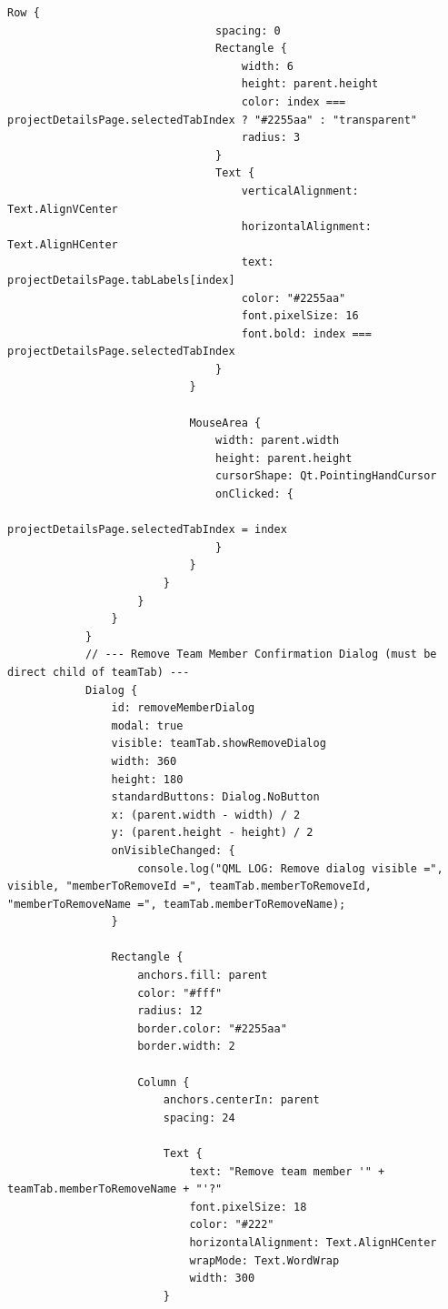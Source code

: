 \documentclass{report}
\begin{document}
\begin{lstlisting}[style=qmlstyle]
                            Row {
                                spacing: 0
                                Rectangle {
                                    width: 6
                                    height: parent.height
                                    color: index === projectDetailsPage.selectedTabIndex ? "#2255aa" : "transparent"
                                    radius: 3
                                }
                                Text {
                                    verticalAlignment: Text.AlignVCenter
                                    horizontalAlignment: Text.AlignHCenter
                                    text: projectDetailsPage.tabLabels[index]
                                    color: "#2255aa"
                                    font.pixelSize: 16
                                    font.bold: index === projectDetailsPage.selectedTabIndex
                                }
                            }

                            MouseArea {
                                width: parent.width
                                height: parent.height
                                cursorShape: Qt.PointingHandCursor
                                onClicked: {
                                    projectDetailsPage.selectedTabIndex = index
                                }
                            }
                        }
                    }
                }
            }
            // --- Remove Team Member Confirmation Dialog (must be direct child of teamTab) ---
            Dialog {
                id: removeMemberDialog
                modal: true
                visible: teamTab.showRemoveDialog
                width: 360
                height: 180
                standardButtons: Dialog.NoButton
                x: (parent.width - width) / 2
                y: (parent.height - height) / 2
                onVisibleChanged: {
                    console.log("QML LOG: Remove dialog visible =", visible, "memberToRemoveId =", teamTab.memberToRemoveId, "memberToRemoveName =", teamTab.memberToRemoveName);
                }

                Rectangle {
                    anchors.fill: parent
                    color: "#fff"
                    radius: 12
                    border.color: "#2255aa"
                    border.width: 2

                    Column {
                        anchors.centerIn: parent
                        spacing: 24

                        Text {
                            text: "Remove team member '" + teamTab.memberToRemoveName + "'?"
                            font.pixelSize: 18
                            color: "#222"
                            horizontalAlignment: Text.AlignHCenter
                            wrapMode: Text.WordWrap
                            width: 300
                        }


\end{lstlisting}
\end{document}
